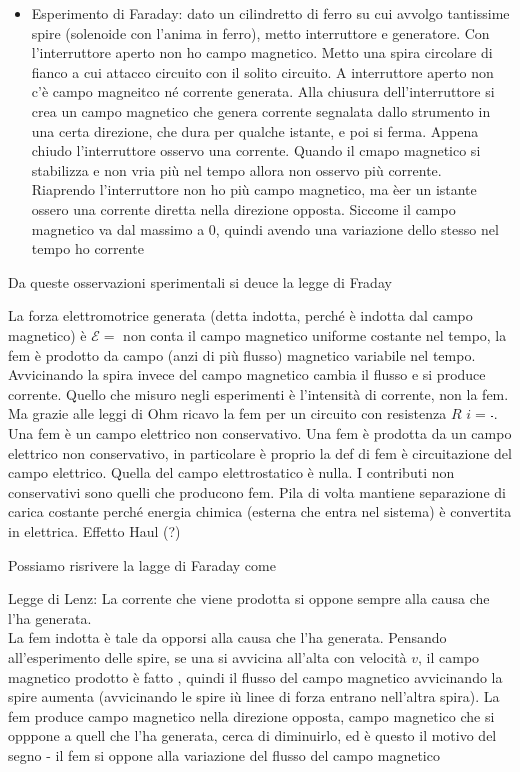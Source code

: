 \begin{equatino*}
\begin{itemize}
	\item Esperimento di Faraday: dato un cilindretto di ferro su cui avvolgo tantissime spire (solenoide con l'anima in ferro), metto interruttore e generatore. Con l'interruttore aperto non ho campo magnetico. Metto una spira circolare di fianco a cui attacco circuito con il solito circuito. A interruttore aperto non c'è campo magneitco né corrente generata. Alla chiusura dell'interruttore si crea un campo magnetico che genera corrente segnalata dallo strumento in una certa direzione, che dura per qualche istante, e poi si ferma. Appena chiudo l'interruttore osservo una corrente. Quando il cmapo magnetico si stabilizza e non vria più nel tempo allora non osservo più corrente.\\
	Riaprendo l'interruttore non ho più campo magnetico, ma èer un istante ossero una corrente diretta nella direzione opposta. Siccome il campo magnetico va dal massimo a 0, quindi avendo una variazione dello stesso nel tempo ho corrente
\end{itemize}

Da queste osservazioni sperimentali si deuce la legge di Fraday

La forza elettromotrice generata (detta indotta, perché è indotta dal campo magnetico) è $\mathcal{E}=$ non conta il campo magnetico uniforme costante nel tempo, la fem è prodotto da campo (anzi di più flusso) magnetico variabile nel tempo. Avvicinando la spira invece del campo magnetico cambia il flusso e si produce corrente. Quello che misuro negli esperimenti è l'intensità di corrente, non la fem. Ma grazie alle leggi di Ohm ricavo la fem per un circuito con resistenza $R$  $i=\frac{  \frac{}{} }{}$.\\

Una fem è un campo elettrico non conservativo. Una fem è prodotta da un campo elettrico non conservativo, in particolare è proprio la def di fem è circuitazione del campo elettrico. Quella del campo elettrostatico è nulla. I contributi non conservativi sono quelli che producono fem. Pila di volta mantiene separazione di carica costante perché energia chimica (esterna che entra nel sistema) è convertita in elettrica. Effetto Haul (?)

Possiamo risrivere la lagge di Faraday come 

Legge di Lenz:
La corrente che viene prodotta si oppone sempre alla causa che l'ha generata.\\
La fem indotta è tale da opporsi alla causa che l'ha generata. 
Pensando all'esperimento delle spire, se una si avvicina all'alta con velocità $v$, il campo magnetico prodotto è fatto , quindi il flusso del campo magnetico avvicinando la spire aumenta (avvicinando le spire iù linee di forza entrano nell'altra spira). La fem produce campo magnetico nella direzione opposta, campo magnetico che si opppone a quell che l'ha generata, cerca di diminuirlo, ed è questo il motivo del segno -
il fem si oppone alla variazione del flusso del campo magnetico



\end{equatino*}
